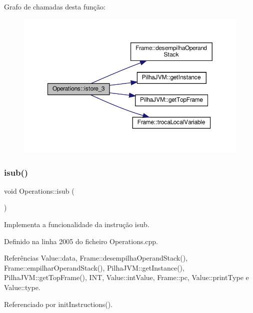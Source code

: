 Grafo de chamadas desta função\+:\nopagebreak
\begin{figure}[H]
\begin{center}
\leavevmode
\includegraphics[width=350pt]{classOperations_a3ff20f0475eaaa28501ea330074f5cb7_cgraph}
\end{center}
\end{figure}
\mbox{\label{classOperations_ab2808e99336de64fefb2a9073bc251de}} 
\subsubsection{\texorpdfstring{isub()}{isub()}}
{\footnotesize\ttfamily void Operations\+::isub (\begin{DoxyParamCaption}{ }\end{DoxyParamCaption})\hspace{0.3cm}{\ttfamily [private]}}



Implementa a funcionalidade da instrução isub. 



Definido na linha 2005 do ficheiro Operations.\+cpp.



Referências Value\+::data, Frame\+::desempilha\+Operand\+Stack(), Frame\+::empilhar\+Operand\+Stack(), Pilha\+J\+V\+M\+::get\+Instance(), Pilha\+J\+V\+M\+::get\+Top\+Frame(), I\+NT, Value\+::int\+Value, Frame\+::pc, Value\+::print\+Type e Value\+::type.



Referenciado por init\+Instructions().

